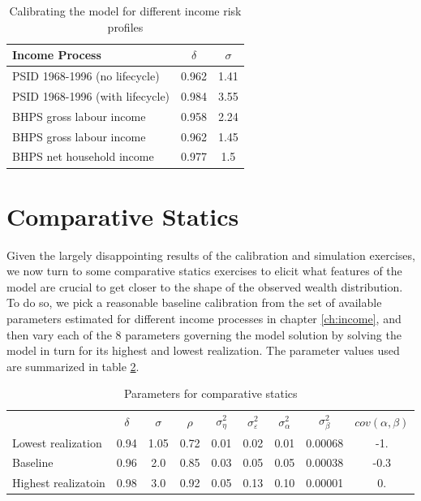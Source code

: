 \begin{table}%
\begin{tabular}{|l|c|c|}
\hline
       Income Process            & $\delta$ & $\sigma$ \\
\hline                          
PSID 1968-1996 (no lifecycle)    &  0.962 & 1.41    \\
PSID 1968-1996 (with lifecycle)  &  0.984 & 3.55    \\
BHPS gross labour income         &  0.958 & 2.24    \\
BHPS gross labour income         &  0.962 & 1.45    \\
BHPS net household income        &  0.977 & 1.5     \\
\hline
\end{tabular}
\caption{Calibrating the model for different income risk profiles}
\label{tab:calibration_results}
\end{table} 

\pagebreak
\section{Comparative Statics}\label{sec:comp_stats}
Given the largely disappointing results of the calibration and simulation exercises,
we now turn to some comparative statics exercises to elicit what features of the 
model are crucial to get closer to the shape of the observed wealth distribution.
To do so, we pick a reasonable baseline calibration from the set of available 
parameters estimated for different income processes in chapter \ref{ch:income}, 
and then vary each of the 8 parameters governing the model solution by solving 
the model in turn for its highest and lowest realization. The parameter values
used are summarized in table \ref{tab:comp_stat_parameters}. 

\begin{table}%
\begin{tabular}{|l|cccccccc|}
                  & $\delta$ & $\sigma$ & $\rho$ & $\sigma^2_{\eta}$ & $\sigma^2_{\varepsilon}$ & $\sigma^2_{\alpha}$ & $\sigma^2_{\beta}$ & $cov(\alpha,\beta)$ \\
Lowest realization  &  0.94  &  1.05  & 0.72   &    0.01           &    0.02                  &     0.01            &      0.00068       &    -1.     \\
Baseline            &  0.96  &  2.0   & 0.85   &    0.03           &    0.05                  &     0.05            &      0.00038       &    -0.3    \\
Highest realizatoin &  0.98  &  3.0   & 0.92   &    0.05           &    0.13                  &     0.10            &      0.00001       &     0.     \\
\end{tabular}
\caption{Parameters for comparative statics}
\label{tab:comp_stat_parameters}
\end{table}

